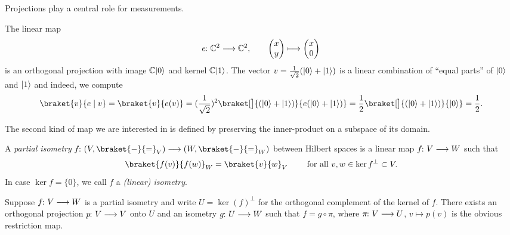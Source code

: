 \documentclass[a4paper, oneside, 12pt]{amsart}
\begin{document}
Projections play a central role for measurements.
\begin{example}\label{ex:proj-onto-0-ket}
  The linear map
  \begin{equation*}
    e \from \mathbb{C}^{2} \to \mathbb{C}^{2}, \qquad
    \begin{pmatrix}
      x \\ y
    \end{pmatrix}
    \mapsto
    \begin{pmatrix}
      x \\ 0
    \end{pmatrix}
  \end{equation*}
  is an orthogonal projection with image \( \mathbb{C} \lvert0\rangle\) and kernel \( \mathbb{C} \lvert1\rangle\).
  The vector \(v = \tfrac{1}{\sqrt{2}}(\lvert0\rangle + \lvert1\rangle)\) is a linear combination of ``equal parts'' of \(\lvert0\rangle\) and \(\lvert1\rangle\) and indeed, we compute
  \begin{equation*}
    \braket{v}{e \mid v}
    = \braket{v}{e(v)}
    = (\frac{1}{\sqrt{2}})^{2} \braket[\big]{(\ket 0 + \ket 1)}{e(\ket 0 + \ket 1)}
    = \frac{1}{2} \braket[\big]{(\ket 0 + \ket 1)}{\ket{0}}
    = \frac{1}{2}.
  \end{equation*}
\end{example}
\bigskip

The second kind of map we are interested in is defined by preserving the inner-product on a subspace of its domain.
\begin{definition}\label{def:partial-isometry}
  A \emph{partial isometry} \(f \from (V, \braket{\blank}{\bblank}_{V})\to (W, \braket{\blank}{ \bblank}_{W})\) between Hilbert spaces is a linear map \(f \from V\to W\) such that
  \begin{equation}
    \braket{f(v)}{f(w)}_{W} = \braket{v}{w}_{V} \qquad \text{ for all } v, w \in \ker f^{\perp}\subset V.
  \end{equation}
  In case \(\ker f =\{0\}\), we call \(f\) a \emph{(linear) isometry}.
\end{definition}

Suppose \( f \from V \to W \) is a partial isometry and write \(U = \ker(f)^\perp \) for the orthogonal complement of the kernel of \( f \).
There exists an orthogonal projection \( p \from V \to V \) onto \( U \) and an isometry \( g \from U \to W \) such that \( f = g \circ \pi \), where \( \pi \from V \to U \), \(v \mapsto p(v)\) is the obvious restriction map.
\end{document}
